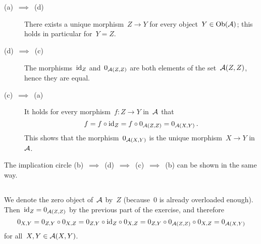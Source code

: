 \section{}





\subsection{}

\begin{description}
  \item[(a)~$\implies$~(d)]
    There exists a unique morphism~$Z \to Y$ for every object~$Y \in \operatorname{Ob}(\mathcal{A})$;
    this holds in particular for~$Y = Z$.
  \item[(d)~$\implies$~(c)]
    The morphisms~$\operatorname{id}_Z$ and~$0_{\mathcal{A}(Z,Z)}$ are both elements of the  set~$\mathcal{A}(Z,Z)$, hence they are equal.
  \item[(c)~$\implies$~(a)]
    It holds for every morphism~$f \colon Z \to Y$ in~$\mathcal{A}$ that
    \[
        f
      = f \circ {\operatorname{id}_Z}
      = f \circ 0_{\mathcal{A}(Z,Z)}
      = 0_{\mathcal{A}(X,Y)} \,.
    \]
    This shows that the morphism~$0_{\mathcal{A}(X,Y)}$ is the unique morphism~$X \to Y$ in~$\mathcal{A}$.
\end{description}
The implication circle (b)~$\implies$~(d)~$\implies$~(c)~$\implies$~(b) can be shown in the same way.





\subsection{}

We denote the zero object of~$\mathcal{A}$ by~$Z$ (because~$0$ is already overloaded enough).
Then~$\operatorname{id}_Z = 0_{\mathcal{A}(Z,Z)}$ by the previous part of the exercise, and therefore
\[
    0_{X,Y}
  = 0_{Z,Y} \circ 0_{X,Z}
  = 0_{Z,Y} \circ {\operatorname{id}_Z} \circ 0_{X,Z}
  = 0_{Z,Y} \circ 0_{\mathcal{A}(Z,Z)} \circ 0_{X,Z}
  = 0_{\mathcal{A}(X,Y)}
\]
for all~$X, Y \in \mathcal{A}(X,Y)$.




